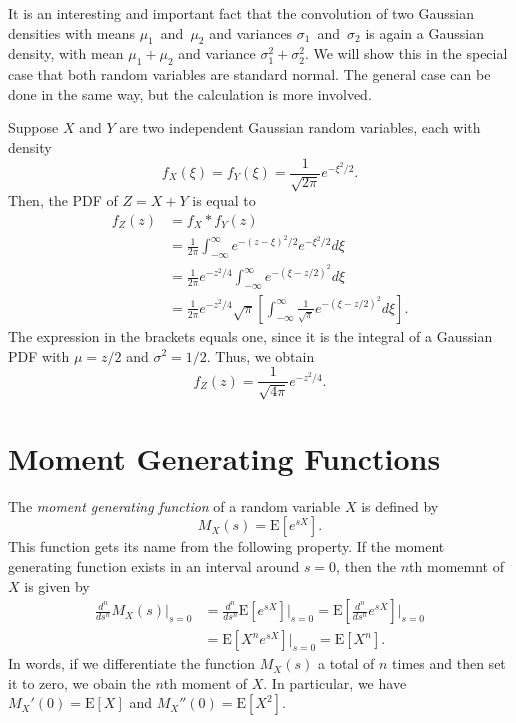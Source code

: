 \begin{example}
It is an interesting and important fact that the convolution of two Gaussian densities with means $\mu_1$~and~$\mu_2$ and variances $\sigma_1$~and~$\sigma_2$ is again a Gaussian density, with mean $\mu_1 + \mu_2$ and variance $\sigma_1^2 + \sigma_2^2$.
We will show this in the special case that both random variables are standard normal.
The general case can be done in the same way, but the calculation is more involved.

Suppose $X$ and $Y$ are two independent Gaussian random variables, each with density
\begin{equation*}
f_X(\xi) = f_Y(\xi) = \frac 1{\sqrt{2\pi}} e^{-\xi^2/2} .
\end{equation*}
Then, the PDF of $Z = X + Y$ is equal to
\begin{equation*}
\begin{split}
f_Z(z) &= f_X * f_Y(z) \\
&= \frac{1}{2\pi}
\int_{-\infty}^{\infty} e^{-(z - \xi)^2/2} e^{-\xi^2/2} d\xi \\
&= \frac{1}{2\pi} e^{-z^2/4} \int_{-\infty}^{\infty} e^{-(\xi - z/2)^2} d\xi \\
&= \frac{1}{2\pi} e^{-z^2/4} \sqrt{\pi}
\left[ \int_{-\infty}^{\infty} \frac{1}{\sqrt{\pi}}
e^{-(\xi-z/2)^2} d\xi \right] .
\end{split}
\end{equation*}
The expression in the brackets equals one, since it is the integral of a Gaussian PDF with $\mu = z/2$ and $\sigma^2 = 1/2$.
Thus, we obtain
\begin{equation*}
f_Z(z) = \frac 1{\sqrt{4\pi}} e^{-z^2/4} .
\end{equation*}
\end{example}


\section{Moment Generating Functions}

The \emph{moment generating function} of a random variable $X$ is defined by
\begin{equation*}
M_X (s) = \mathrm{E} \left[ e^{s X} \right] .
\end{equation*}
This function gets its name from the following property.
If the moment generating function exists in an interval around $s = 0$, then the $n$th momemnt of $X$ is given by
\begin{equation*}
\begin{split}
\frac{d^n}{ds^n} M_X (s) \Big|_{s=0}
&= \frac{d^n}{ds^n} \mathrm{E} \left[ e^{s X} \right] \Big|_{s=0}
= \mathrm{E} \left[ \frac{d^n}{ds^n} e^{s X} \right] \bigg|_{s=0} \\
&= \mathrm{E} \left[ X^n e^{s X} \right] \Big|_{s=0}
= \mathrm{E} [X^n] .
\end{split}
\end{equation*}
In words, if we differentiate the function $M_X(s)$ a total of $n$ times and then set it to zero, we obain the $n$th moment of $X$.
In particular, we have $M_X'(0) = \mathrm{E} [X]$ and $M_X''(0) = \mathrm{E} [X^2]$.

